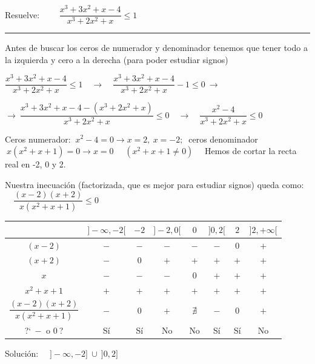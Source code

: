 \begin{miejercicio}

Resuelve: $\qquad \dfrac{x^3+3x^2+x-4}{x^3+2x^2+x} \leqslant 1$

\rule{250pt}{0.1pt}

\vspace{4mm} Antes de buscar los ceros de numerador y denominador tenemos que tener todo a la izquierda y cero a la derecha (para poder estudiar signos)

\vspace{2mm} $\dfrac{x^3+3x^2+x-4}{x^3+2x^2+x} \leqslant 1 \quad \to \quad \dfrac{x^3+3x^2+x-4}{x^3+2x^2+x} -1\leqslant 0 \ \to $

\vspace{2mm} $\to \ \dfrac{x^3+3x^2+x-4-(x^3+2x^2+x)}{x^3+2x^2+x}\leqslant 0 \quad \to \quad \dfrac{x^2-4}{x^3+2x^2+x} \leqslant 0 $

\vspace{2mm} Ceros numerador: $\ x^2-4=0 \to x=2,\ x=-2;\ $ ceros denominador $\ x(x^2+x+1)=0 \to x=0\quad $ \textcolor{gris}{$(x^2+x+1\neq 0)\quad $}  Hemos de cortar la recta real en -2, 0 y 2.

\vspace{2mm} Nuestra inecuación (factorizada, que es mejor para estudiar signos) queda como: $\quad \dfrac{(x-2)(x+2)}{x(x^2+x+1)}\leqslant 0$

\begin{table}[H]
\centering
\begin{tabular}{c|c|c|c|c|c|c|c|}
 & $]-\infty,-2[$  & $-2$ & $]-2,0[$ & $0$ & $]0,2[$ & $2$ & $]2,+\infty[$ \\ \hline
$(x-2)$ & $-$ & $-$ & $-$ & $-$ & $-$ & $0$ & $+$ \\ \hline
$(x+2)$ & $-$ & $0$ & $+$ & $+$ & $+$ & $+$ & $+$ \\ \hline
$x$ & $-$ & $-$ & $-$ & $0$ & $+$ & $+$ & $+$ \\ \hline
$x^2+x+1$ & $+$ & $+$ & $+$ & $+$ & $+$ & $+$ & $+$ \\ \hline
$\dfrac{(x-2)(x+2)}{x(x^2+x+1)}$ & $-$ & $0$ & $+$ & $\nexists$ & $-$ & $0$ & $+$ \\ \hline
?`$\ - \text{ o } 0\ $? & Sí & Sí & No & No & Sí & Sí & No \\ \hline
\end{tabular}
\end{table}

\vspace{2mm} Solución: $\quad ]-\infty,-2]\ \cup \ ]0,2]$
	
\end{miejercicio}


